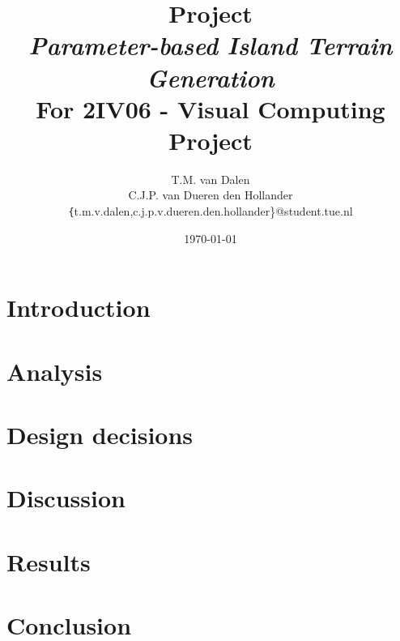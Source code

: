 \documentclass[11pt,a4paper,twocolumn]{article}
\title{
	{\huge Project\\ \emph{Parameter-based Island Terrain Generation}}\\
	{\large For 2IV06 - Visual Computing Project}
}
\author{
	T.M. van Dalen \\
	C.J.P. van Dueren den Hollander\\
	{\texttt\{t.m.v.dalen,c.j.p.v.dueren.den.hollander\}}@student.tue.nl
}
\date{\today}
\begin{document}
	\maketitle
	
	
	
	\section{Introduction}
	\label{sec:intro}
	
	
	\section{Analysis}
	\label{sec:analysis}
	
	
	\section{Design decisions}
	\label{sec:choices}
	
	
	\section{Discussion}
	\label{sec:discussion}
	
	
	\section{Results}
	\label{sec:results}
	
	
	\section{Conclusion}
	\label{sec:conclusion}
	

	
	
\end{document}

